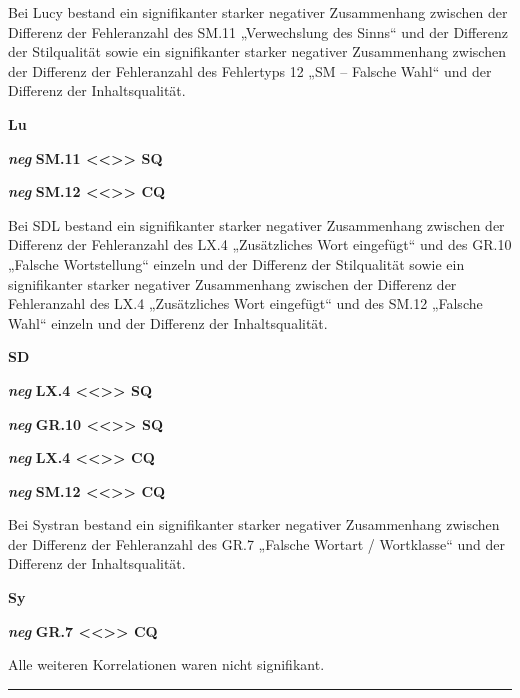 \medskip
 \noindent
 \parbox[t]{.7\textwidth}{Bei Lucy bestand ein signifikanter starker negativer Zusammenhang zwischen der Differenz der Fehleranzahl des SM.11 „Verwechslung des Sinns“ und der Differenz der Stilqualität
sowie ein signifikanter starker negativer Zusammenhang zwischen der Differenz der Fehleranzahl des Fehlertyps 12 „SM -- Falsche Wahl“ und der Differenz der Inhaltsqualität.}
 \parbox[t]{.04\textwidth}{}
 \colorbox{smGreen}{\parbox[t]{.25\textwidth}{\textbf{Lu}

 { \textbf{\textit{neg}} \textbf{SM.11 <{}<{}>{}> SQ}}

  \textbf{\textit{neg}} \textbf{SM.12 <{}<{}>{}> CQ}\vspace{52pt}}}

  \medskip
   \noindent
   \parbox[t]{.7\textwidth}{Bei SDL bestand ein signifikanter starker negativer Zusammenhang zwischen der Differenz der Fehleranzahl des LX.4 „Zusätzliches Wort eingefügt“ und des GR.10 „Falsche Wortstellung“ einzeln und der Differenz der Stilqualität sowie ein signifikanter starker negativer Zusammenhang zwischen der Differenz der Fehleranzahl des LX.4 „Zusätzliches Wort eingefügt“ und des SM.12 „Falsche Wahl“ einzeln und der Differenz der Inhaltsqualität.}
   \parbox[t]{.04\textwidth}{}
   \colorbox{smGreen}{\parbox[t]{.25\textwidth}{\textbf{SD}

   { \textbf{\textit{neg}} \textbf{LX.4 <{}<{}>{}> SQ}}

   { \textbf{\textit{neg}} \textbf{GR.10 <{}<{}>{}> SQ}}

   { \textbf{\textit{neg}} \textbf{LX.4 <{}<{}>{}> CQ}}

    \textbf{\textit{neg}} \textbf{SM.12 <{}<{}>{}> CQ}\vspace{42pt}}}

    \medskip
     \noindent
     \parbox[t]{.7\textwidth}{Bei Systran bestand ein signifikanter starker negativer Zusammenhang zwischen der Differenz der Fehleranzahl des GR.7 „Falsche Wortart / Wortklasse“ und der Differenz der Inhaltsqualität.}
     \parbox[t]{.04\textwidth}{}
     \colorbox{smGreen}{\parbox[t]{.25\textwidth}{\textbf{Sy}

      \textbf{\textit{neg}} \textbf{GR.7 <{}<{}>{}> CQ}\vspace{25pt}}}

  \medskip
  \noindent
  \parbox[t]{.7\textwidth}{Alle weiteren Korrelationen waren nicht signifikant.}
\hrule
